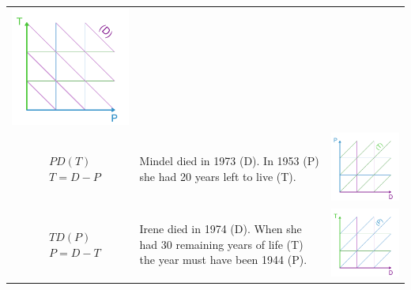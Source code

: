 \documentclass[12pt,oneside,a4paper]{article} %
\begin{document}
\begin{longtable}{m{}L{0.4\textwidth}m{0.2\textwidth}}
  \includegraphics[scale=.5]{Figures/DiagramTable/TP_rt.pdf} %
   \\
  $$\begin{aligned}
    &PD(T) \\
    &T = D - P
  \end{aligned}$$ &
  Mindel died in 1973 (D). In 1953 (P) she had 20 years left to live (T). &
  \includegraphics[scale=.5]{Figures/DiagramTable/PD_rt.pdf} %
   \\
  $$\begin{aligned}
    &TD(P) \\
    &P = D - T
  \end{aligned}$$ &
  Irene died in 1974 (D). When she had 30 remaining years of life (T) the year must have been 1944 (P). &
  \includegraphics[scale=.5]{Figures/DiagramTable/TD_rt.pdf} %

\end{longtable}
\end{document}
